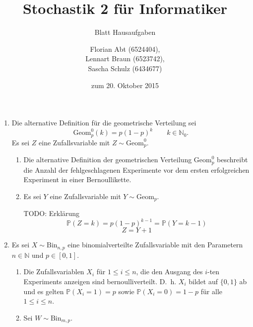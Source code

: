 \documentclass[a4paper]{scrartcl}
\title{Stochastik 2 für Informatiker}
\subtitle{Blatt \blattnr Hausaufgaben}
\author{
    Florian Abt (6524404), \\
    Lennart Braun (6523742), \\
    Sascha Schulz (6434677)
}
\date{zum 20. Oktober 2015}
\newcommand{\prob}{\mathbb{P}}
\begin{document}
\maketitle

\begin{enumerate}[label=\bfseries 1.\arabic*]
    \item
        Die alternative Definition für die geometrische Verteilung sei
        \begin{equation*}
            \text{Geom}_p^0(k) = p(1-p)^k \qquad k \in \mathbb{N}_0 \text{.}
        \end{equation*}
        Es sei $Z$ eine Zufallsvariable mit $Z \sim \text{Geom}_p^0$.
        \begin{enumerate}[label=\alph*)]
            \item
                Die alternative Definition der geometrischen Verteilung
                $\text{Geom}_p^0$ beschreibt die Anzahl der fehlgeschlagenen
                Experimente vor dem ersten erfolgreichen Experiment in einer
                Bernoullikette.

            \item
                Es sei $Y$ eine Zufallsvariable mit $Y \sim \text{Geom}_p$.

                TODO: Erklärung
                \begin{equation*}
                    \prob(Z=k) = p(1-p)^{k-1} = \prob(Y=k-1)
                \end{equation*}
                \begin{equation*}
                    Z = Y + 1
                \end{equation*}

        \end{enumerate}

    \item
        Es sei $X \sim \text{Bin}_{n,p}$ eine binomialverteilte Zufallsvariable
        mit den Parametern $n \in \mathbb{N}$ und $p \in [0,1]$.
        \begin{enumerate}[label=\alph*)]
            \item
                Die Zufallsvariablen $X_i$ für $1 \leq i \leq n$, die den
                Ausgang des $i$-ten Experiments anzeigen sind
                bernoulliverteilt.  D.~h. $X_i$ bildet auf $\{0,1\}$ ab und es
                gelten $\prob(X_i=1) = p$ sowie $\prob(X_i=0) = 1-p$
                für alle $1 \leq i \leq n$.

            \item
                Sei $W \sim \text{Bin}_{m,p}$.


\end{enumerate}
\end{enumerate}
\end{document}
